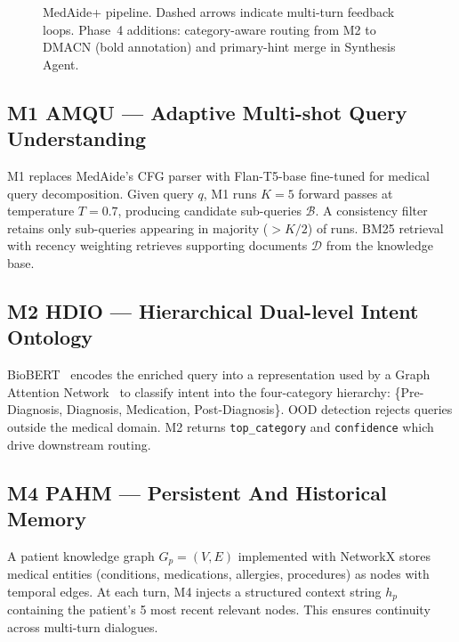 \documentclass[conference]{IEEEtran}
\begin{document}
\begin{figure}[t]
\caption{MedAide+ pipeline. Dashed arrows indicate multi-turn feedback loops. Phase~4 additions: category-aware routing from M2 to DMACN (bold annotation) and primary-hint merge in Synthesis Agent.}
\label{fig:architecture}
\end{figure}

\subsection{M1 AMQU — Adaptive Multi-shot Query Understanding}
M1 replaces MedAide's CFG parser with Flan-T5-base fine-tuned for medical query decomposition. Given query $q$, M1 runs $K=5$ forward passes at temperature $T=0.7$, producing candidate sub-queries $\mathcal{B}$. A consistency filter retains only sub-queries appearing in majority ($>K/2$) of runs. BM25 retrieval with recency weighting retrieves supporting documents $\mathcal{D}$ from the knowledge base.

\subsection{M2 HDIO — Hierarchical Dual-level Intent Ontology}
BioBERT~\cite{lee2020biobert} encodes the enriched query into a representation used by a Graph Attention Network~\cite{velickovic2018gat} to classify intent into the four-category hierarchy: \{Pre-Diagnosis, Diagnosis, Medication, Post-Diagnosis\}. OOD detection rejects queries outside the medical domain. M2 returns \texttt{top\_category} and \texttt{confidence} which drive downstream routing.

\subsection{M4 PAHM — Persistent And Historical Memory}
A patient knowledge graph $G_p = (V, E)$ implemented with NetworkX stores medical entities (conditions, medications, allergies, procedures) as nodes with temporal edges. At each turn, M4 injects a structured context string $h_p$ containing the patient's 5 most recent relevant nodes. This ensures continuity across multi-turn dialogues.
\end{document}
